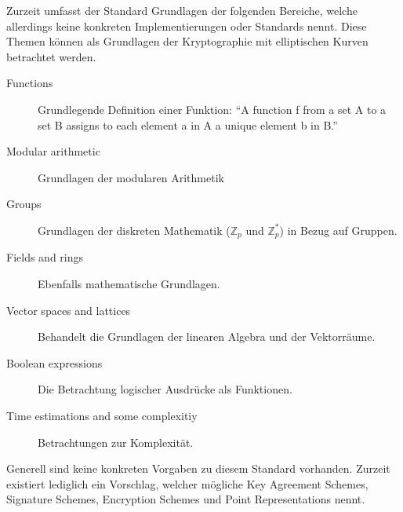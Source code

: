 \documentclass[10pt,a4paper]{article}
\begin{document}
Zurzeit umfasst der Standard Grundlagen der folgenden Bereiche, welche allerdings keine
konkreten Implementierungen oder Standards nennt. Diese Themen können als Grundlagen der
Kryptographie mit elliptischen Kurven betrachtet werden.

\begin{description}
    \item[Functions] Grundlegende Definition einer Funktion: "`A function f from a set A
        to a set B assigns to each element a in A a unique element b in
        B."'~\cite{pkcs13-func}
    \item[Modular arithmetic] Grundlagen der modularen Arithmetik
    \item[Groups] Grundlagen der diskreten Mathematik ($\mathbb{Z}_p$ und
        $\mathbb{Z}_p^*$) in Bezug auf Gruppen.
    \item[Fields and rings] Ebenfalls mathematische Grundlagen.
    \item[Vector spaces and lattices] Behandelt die Grundlagen der linearen Algebra und
        der Vektorräume.
    \item[Boolean expressions] Die Betrachtung logischer Ausdrücke als Funktionen.
    \item[Time estimations and some complexitiy] Betrachtungen zur Komplexität.
\end{description}

Generell sind keine konkreten Vorgaben zu diesem Standard vorhanden. Zurzeit existiert
lediglich ein Vorschlag, welcher mögliche Key Agreement Schemes, Signature Schemes,
Encryption Schemes und Point Representations nennt.
\end{document}
